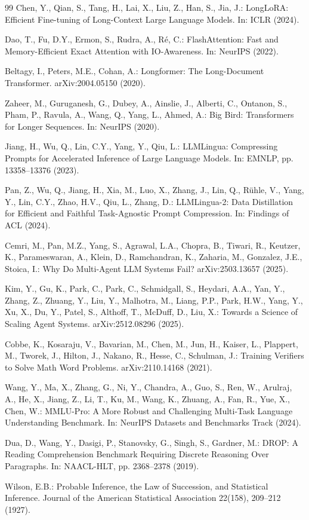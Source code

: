 \documentclass[
  runningheads]{llncs}
\begin{document}
\begin{thebibliography}{99}
Chen, Y., Qian, S., Tang, H., Lai, X., Liu, Z., Han, S., Jia, J.: LongLoRA: Efficient Fine-tuning of Long-Context Large Language Models. In: ICLR (2024).

Dao, T., Fu, D.Y., Ermon, S., Rudra, A., Ré, C.: FlashAttention: Fast and Memory-Efficient Exact Attention with IO-Awareness. In: NeurIPS (2022).

Beltagy, I., Peters, M.E., Cohan, A.: Longformer: The Long-Document Transformer. arXiv:2004.05150 (2020).

Zaheer, M., Guruganesh, G., Dubey, A., Ainslie, J., Alberti, C., Ontanon, S., Pham, P., Ravula, A., Wang, Q., Yang, L., Ahmed, A.: Big Bird: Transformers for Longer Sequences. In: NeurIPS (2020).

Jiang, H., Wu, Q., Lin, C.Y., Yang, Y., Qiu, L.: LLMLingua: Compressing Prompts for Accelerated Inference of Large Language Models. In: EMNLP, pp. 13358--13376 (2023).

Pan, Z., Wu, Q., Jiang, H., Xia, M., Luo, X., Zhang, J., Lin, Q., Rühle, V., Yang, Y., Lin, C.Y., Zhao, H.V., Qiu, L., Zhang, D.: LLMLingua-2: Data Distillation for Efficient and Faithful Task-Agnostic Prompt Compression. In: Findings of ACL (2024).

Cemri, M., Pan, M.Z., Yang, S., Agrawal, L.A., Chopra, B., Tiwari, R., Keutzer, K., Parameswaran, A., Klein, D., Ramchandran, K., Zaharia, M., Gonzalez, J.E., Stoica, I.: Why Do Multi-Agent LLM Systems Fail? arXiv:2503.13657 (2025).

Kim, Y., Gu, K., Park, C., Park, C., Schmidgall, S., Heydari, A.A., Yan, Y., Zhang, Z., Zhuang, Y., Liu, Y., Malhotra, M., Liang, P.P., Park, H.W., Yang, Y., Xu, X., Du, Y., Patel, S., Althoff, T., McDuff, D., Liu, X.: Towards a Science of Scaling Agent Systems. arXiv:2512.08296 (2025).

Cobbe, K., Kosaraju, V., Bavarian, M., Chen, M., Jun, H., Kaiser, L., Plappert, M., Tworek, J., Hilton, J., Nakano, R., Hesse, C., Schulman, J.: Training Verifiers to Solve Math Word Problems. arXiv:2110.14168 (2021).

Wang, Y., Ma, X., Zhang, G., Ni, Y., Chandra, A., Guo, S., Ren, W., Arulraj, A., He, X., Jiang, Z., Li, T., Ku, M., Wang, K., Zhuang, A., Fan, R., Yue, X., Chen, W.: MMLU-Pro: A More Robust and Challenging Multi-Task Language Understanding Benchmark. In: NeurIPS Datasets and Benchmarks Track (2024).

Dua, D., Wang, Y., Dasigi, P., Stanovsky, G., Singh, S., Gardner, M.: DROP: A Reading Comprehension Benchmark Requiring Discrete Reasoning Over Paragraphs. In: NAACL-HLT, pp. 2368--2378 (2019).

Wilson, E.B.: Probable Inference, the Law of Succession, and Statistical Inference. Journal of the American Statistical Association 22(158), 209--212 (1927).

\end{thebibliography}
\end{document}

